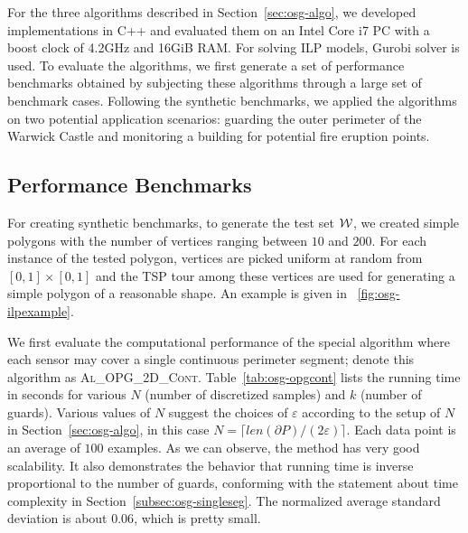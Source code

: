 For the three algorithms described in Section~\ref{sec:osg-algo}, we developed
implementations in C++ and evaluated them on an Intel Core i7 PC with a 
boost clock of 4.2GHz and 16GiB RAM. For solving ILP models, 
Gurobi solver \cite{optimization2019gurobi} is used. 
%
To evaluate the algorithms, we first generate a set of performance 
benchmarks obtained by subjecting these algorithms through a large set 
of benchmark cases. 
%
Following the synthetic benchmarks, we applied the algorithms on two 
potential application scenarios: guarding the outer perimeter of the 
Warwick Castle and monitoring a building for potential fire eruption 
points.
 
\subsection{Performance Benchmarks}
For creating synthetic benchmarks, to generate the test set $\mathcal W$, we 
created simple polygons with the number of vertices ranging between 
$10$ and $200$. 
%
For each instance of the tested polygon, vertices are picked uniform at 
random from $[0,1]\times[0,1]$ and the TSP tour among these vertices are 
used for generating a simple polygon of a reasonable shape.
%
An example is given in ~\ref{fig:osg-ilpexample}.

\def\opgtc{\textsc{Al\_OPG\_2D\_Cont}\xspace}
\def\opgtilp{\textsc{Al\_OPG\_2D\_ILP}\xspace}
\def\orgtilp{\textsc{Al\_ORG\_2D\_ILP}\xspace}
We first evaluate the computational performance of the special \opgt
algorithm where each sensor may cover a single continuous perimeter
segment; denote this algorithm as \opgtc.
%
Table~\ref{tab:osg-opgcont} lists the running time in seconds for 
various $N$ (number of discretized samples) and $k$ (number of guards). 
Various values of $N$ suggest the choices of $\varepsilon$ according to 
the setup of $N$ in Section~\ref{sec:osg-algo}, in this case 
$N=\lceil {len(\partial P)}/{(2\varepsilon)} \rceil$.
Each data point is an average of $100$ examples. As we can observe, the 
method has very good scalability. It also demonstrates the behavior that 
running time is inverse proportional to the number of guards, 
conforming with the statement about time complexity in Section~\ref{subsec:osg-singleseg}. 
The normalized 
average standard deviation is about $0.06$, which is pretty small. 

